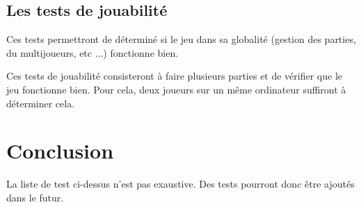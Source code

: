\subsection{Les tests de jouabilité}

Ces tests permettront de déterminé si le jeu dans sa globalité (gestion des parties, du multijoueurs, etc ...) fonctionne bien.

Ces tests de jouabilité consisteront à faire plusieurs parties et de vérifier que le jeu fonctionne bien. Pour cela, deux joueurs sur un même ordinateur suffiront à déterminer cela.


\section*{Conclusion}


La liste de test ci-dessus n'est pas exaustive. Des tests pourront donc être ajoutés dans le futur.
